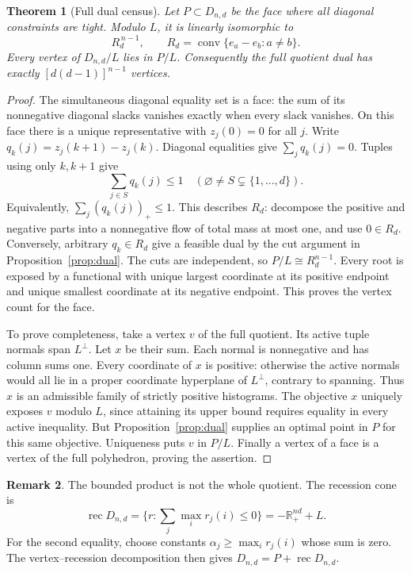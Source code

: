 \documentclass[11pt]{article}
\newtheorem{theorem}{Theorem}[section]
\theoremstyle{definition}\newtheorem{definition}[theorem]{Definition}
\newtheorem{remark}[theorem]{Remark}
\newcommand{\R}{\mathbb R}
\newcommand{\1}{\mathbf 1}
\newcommand{\conv}{\operatorname{conv}}
\begin{document}
\begin{theorem}[Full dual census]\label{thm:census}
Let $P\subset D_{n,d}$ be the face where all diagonal constraints are tight.
Modulo $L$, it is linearly isomorphic to
\[
 R_d^{\,n-1},\qquad R_d=\conv\{e_a-e_b:a\ne b\}.
\]
Every vertex of $D_{n,d}/L$ lies in $P/L$. Consequently the full quotient dual
has exactly $[d(d-1)]^{n-1}$ vertices.
\end{theorem}
\begin{proof}
The simultaneous diagonal equality set is a face: the sum of its nonnegative
diagonal slacks vanishes exactly when every slack vanishes. On this face there
is a unique representative with $z_j(0)=0$ for all $j$. Write
$q_k(j)=z_j(k+1)-z_j(k)$. Diagonal equalities give $\sum_jq_k(j)=0$.
Tuples using only $k,k+1$ give
\[
 \sum_{j\in S}q_k(j)\le1\quad(\varnothing\ne S\subsetneq\{1,\ldots,d\}).
\]
Equivalently, $\sum_j(q_k(j))_+\le1$. This describes $R_d$: decompose the
positive and negative parts into a nonnegative flow of total mass at most one,
and use $0\in R_d$. Conversely, arbitrary $q_k\in R_d$ give a feasible dual
by the cut argument in Proposition~\ref{prop:dual}. The cuts are independent,
so $P/L\cong R_d^{n-1}$. Every root is exposed by a functional with unique
largest coordinate at its positive endpoint and unique smallest coordinate at
its negative endpoint. This proves the vertex count for the face.

To prove completeness, take a vertex $v$ of the full quotient. Its active tuple
normals span $L^\perp$. Let $x$ be their sum. Each normal is nonnegative and
has column sums one. Every coordinate of $x$ is positive: otherwise the active
normals would all lie in a proper coordinate hyperplane of $L^\perp$, contrary
to spanning. Thus $x$ is an admissible family of strictly positive histograms.
The objective $x$ uniquely exposes $v$ modulo $L$, since attaining its upper
bound requires equality in every active inequality. But
Proposition~\ref{prop:dual} supplies an optimal point in $P$ for this same
objective. Uniqueness puts $v$ in $P/L$. Finally a vertex of a face is a vertex
of the full polyhedron, proving the assertion.
\end{proof}

\begin{remark}
The bounded product is not the whole quotient. The recession cone is
\[
 \operatorname{rec}D_{n,d}
 =\{r:\textstyle\sum_j\max_i r_j(i)\le0\}
 =-\R_+^{nd}+L.
\]
For the second equality, choose constants $\alpha_j\ge\max_i r_j(i)$ whose sum
is zero. The vertex--recession decomposition then gives
$D_{n,d}=P+\operatorname{rec}D_{n,d}$.
\end{remark}
\end{document}

